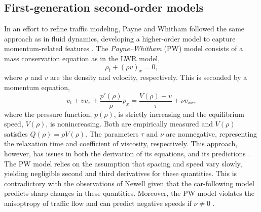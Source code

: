 \documentclass[preprint]{elsarticle}
\begin{document}

\subsection{First-generation second-order models}
In an effort to refine traffic modeling, Payne and Whitham followed the same approach as in fluid dynamics, developing a higher-order model to capture momentum-related features \cite{payne1971models,whitham1974linear}. The \textit{Payne--Whitham} (PW) model consists of a mass conservation equation as in the LWR model,  
\begin{equation}
\rho_t + (\rho v)_x = 0, 
\end{equation}
where $\rho$ and $v$ are the density and velocity, respectively. This is seconded by a momentum equation,
\begin{equation}
v_t+vv_x+\frac{p'\left(\rho\right)}{\rho}\rho_x =\frac{V(\rho)-v}{\tau}+\nu v_{xx} ,
\end{equation}
where the pressure function, $p(\rho)$, is strictly increasing and the equilibrium speed, $V(\rho)$, is nonincreasing. Both are empirically measured and $V(\rho)$ satisfies $Q(\rho) = \rho V(\rho)$. The parameters $\tau$ and $\nu$ are nonnegative, representing the relaxation time and coefficient of viscosity, respectively. This approach, however, has issues in both the derivation of its equations, and its predictions \cite{Dag_requiem}. The PW model relies on the assumption that spacing and speed vary slowly, yielding negligible second and third derivatives for these quantities. This is contradictory with the observations of Newell \cite{Newell} given that the car-following model predicts sharp changes in these quantities. Moreover, the PW model violates the anisoptropy of traffic flow and can predict negative speeds if $\nu \neq 0$ \cite{Z}.

\end{document}
